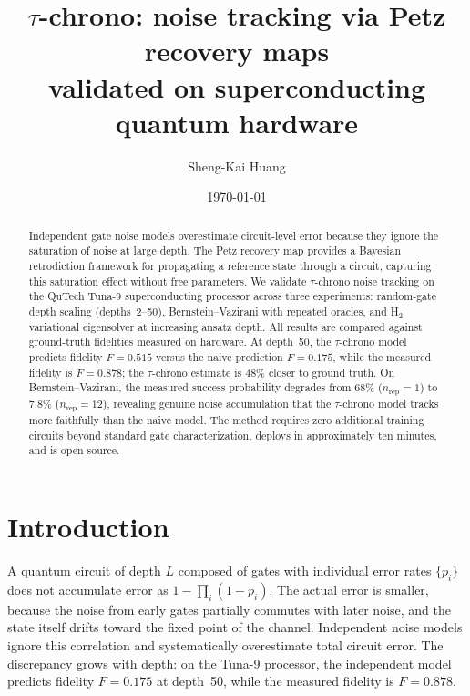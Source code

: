 \documentclass[prl,twocolumn,superscriptaddress,longbibliography]{revtex4-2}
\begin{document}
\title{$\tau$-chrono: noise tracking via Petz recovery maps\\ validated on superconducting quantum hardware}

\author{Sheng-Kai Huang}

\date{\today}

\begin{abstract}
Independent gate noise models overestimate circuit-level error because they ignore the saturation of noise at large depth. The Petz recovery map provides a Bayesian retrodiction framework for propagating a reference state through a circuit, capturing this saturation effect without free parameters. We validate $\tau$-chrono noise tracking on the QuTech Tuna-9 superconducting processor across three experiments: random-gate depth scaling (depths~2--50), Bernstein--Vazirani with repeated oracles, and H$_2$ variational eigensolver at increasing ansatz depth. All results are compared against ground-truth fidelities measured on hardware. At depth~50, the $\tau$-chrono model predicts fidelity $F = 0.515$ versus the naive prediction $F = 0.175$, while the measured fidelity is $F = 0.878$; the $\tau$-chrono estimate is 48\% closer to ground truth. On Bernstein--Vazirani, the measured success probability degrades from 68\% ($n_{\text{rep}} = 1$) to 7.8\% ($n_{\text{rep}} = 12$), revealing genuine noise accumulation that the $\tau$-chrono model tracks more faithfully than the naive model. The method requires zero additional training circuits beyond standard gate characterization, deploys in approximately ten minutes, and is open source.
\end{abstract}

\maketitle

\section{Introduction}

A quantum circuit of depth $L$ composed of gates with individual error rates $\{p_i\}$ does not accumulate error as $1 - \prod_i(1-p_i)$. The actual error is smaller, because the noise from early gates partially commutes with later noise, and the state itself drifts toward the fixed point of the channel. Independent noise models ignore this correlation and systematically overestimate total circuit error. The discrepancy grows with depth: on the Tuna-9 processor, the independent model predicts fidelity $F = 0.175$ at depth~50, while the measured fidelity is $F = 0.878$.
\end{document}
